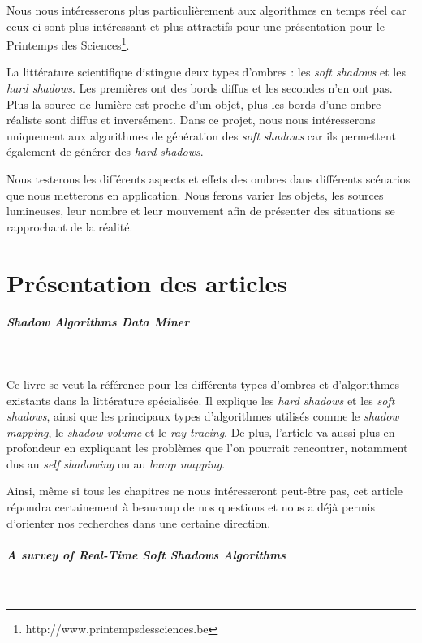 \documentclass[a4paper,10pt]{report}
\begin{document}
Nous nous intéresserons plus particulièrement aux algorithmes en temps réel car ceux-ci sont plus intéressant et plus attractifs pour une présentation pour le Printemps des Sciences\footnote{http://www.printempsdessciences.be}.

La littérature scientifique distingue deux types d'ombres : les \textit{soft shadows} et les \textit{hard shadows}. Les premières ont des bords diffus et les secondes n'en ont pas. Plus la source de lumière est proche d'un objet, plus les bords d'une ombre réaliste sont diffus et inversément.
Dans ce projet, nous nous intéresserons uniquement aux algorithmes de génération des \textit{soft shadows} car ils permettent également de générer des \textit{hard shadows}.

Nous testerons les différents aspects et effets des ombres dans différents scénarios que nous metterons en application. Nous ferons varier les objets, les sources lumineuses, leur nombre et leur mouvement afin de présenter des situations se rapprochant de la réalité.


\chapter{Présentation des articles}

\paragraph{\large Shadow Algorithms Data Miner}
~~\\
\cite{shadowalgorithmsdataminer}

Ce livre se veut la référence pour les différents types d'ombres et d'algorithmes existants dans la littérature spécialisée. Il explique les \textit{hard shadows} et les \textit{soft shadows}, ainsi que les principaux types d'algorithmes utilisés comme le \textit{shadow mapping}, le \textit{shadow volume} et le \textit{ray tracing}. De plus, l'article va aussi plus en profondeur en expliquant les problèmes que l'on pourrait rencontrer, notamment dus au \textit{self shadowing} ou au \textit{bump mapping}.

Ainsi, même si tous les chapitres ne nous intéresseront peut-être pas, cet article répondra certainement à beaucoup de nos questions et nous a déjà permis d'orienter nos recherches dans une certaine direction.

\paragraph{\large A survey of Real-Time Soft Shadows Algorithms }
~~\\
\cite{hasenfratz2003survey}
\end{document}
